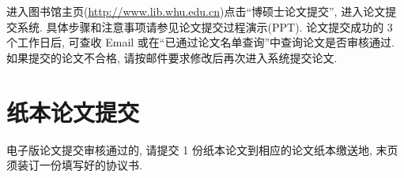     进入图书馆主页(\url{http://www.lib.whu.edu.cn})点击``博硕士论文提交'', 进入论文提交系统.
    具体步骤和注意事项请参见论文提交过程演示(PPT).
    论文提交成功的 3 个工作日后, 可查收 Email 或在``已通过论文名单查询''中查询论文是否审核通过.
    如果提交的论文不合格, 请按邮件要求修改后再次进入系统提交论文.


\section*{纸本论文提交}

    电子版论文提交审核通过的, 请提交 1 份纸本论文到相应的论文纸本缴送地,
    末页须装订一份填写好的协议书.

\appendix
